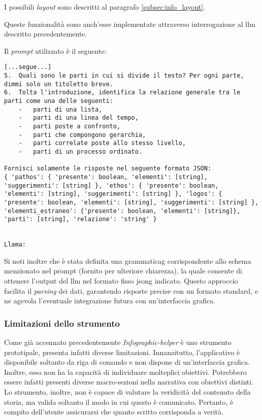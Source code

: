 I possibili \emph{layout} sono descritti al paragrafo \ref{subsec:info_layout}.

\bigskip
\noindent Queste funzionalità sono anch'esse implementate attraverso interrogazione al \gls{llm} descritto precedentemente. 

Il \emph{prompt} utilizzato è il seguente:
\begin{lstlisting}[style=htmlcssjs]
[...segue...]
5.	Quali sono le parti in cui si divide il testo? Per ogni parte, dimmi solo un titoletto breve.
6.	Tolta l'introduzione, identifica la relazione generale tra le parti come una delle seguenti:
    -	parti di una lista, 
    -	parti di una linea del tempo, 
    -	parti poste a confronto, 
    -	parti che compongono gerarchia, 
    -	parti correlate poste allo stesso livello, 
    -	parti di un processo ordinato. 

Fornisci solamente le risposte nel seguente formato JSON: 
{ 'pathos': { 'presente': boolean, 'elementi': [string], 'suggerimenti': [string] }, 'ethos': { 'presente': boolean, 'elementi': [string], 'suggerimenti': [string] }, 'logos': { 'presente': boolean, 'elementi': [string], 'suggerimenti': [string] }, 'elementi_estraneo': {'presente': boolean, 'elementi': [string]}, 'parti': [string], 'relazione': 'string' }


Llama:
\end{lstlisting}

\noindent Si noti inoltre che è stata definita una \gls{grammaticag} corrispondente allo schema menzionato nel prompt (fornito per ulteriore chiarezza), la quale consente di ottenere l'output del \gls{llm} nel formato fisso \gls{jsong} indicato. 
Questo approccio facilita il \emph{parsing} dei dati, garantendo risposte precise con un formato standard, e ne agevola l'eventuale integrazione futura con un'interfaccia grafica.


\subsubsection{Limitazioni dello strumento}
Come già accennato precedentemente \emph{Infographic-helper} è uno strumento prototipale, presenta infatti diverse limitazioni.
Innanzitutto, l'applicativo è disponibile soltanto da riga di comando e non dispone di un'interfaccia grafica.
Inoltre, esso non ha la capacità di individuare molteplici obiettivi. Potrebbero essere infatti presenti diverse macro-sezioni nella narrativa
con obiettivi distinti. 
Lo strumento, inoltre, non è capace di valutare la veridicità del contenuto della storia, ma valida soltanto il modo in cui questo è comunicato. Pertanto, è compito dell'utente
assicurarsi che quanto scritto corrisponda a verità.


